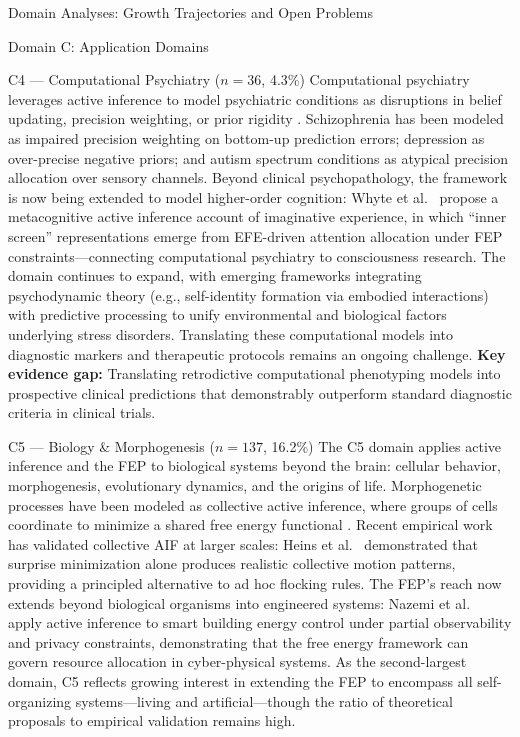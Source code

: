 \documentclass[
  ignorenonframetext,
]{beamer}
\begin{document}
\begin{frame}{Domain Analyses: Growth Trajectories and Open Problems
\label{sec:subfield_analyses}}
\begin{block}{Domain C: Application Domains}
\begin{block}{C4 --- Computational Psychiatry (\(n = 36\), 4.3\%)}
\protect{}\label{c4-computational-psychiatry-n-36-4.3}
Computational psychiatry leverages active inference to model psychiatric
conditions as disruptions in belief updating, precision weighting, or
prior rigidity \citep{smith2021computational}. Schizophrenia has been
modeled as impaired precision weighting on bottom-up prediction errors;
depression as over-precise negative priors; and autism spectrum
conditions as atypical precision allocation over sensory channels.
Beyond clinical psychopathology, the framework is now being extended to
model higher-order cognition: Whyte et
al.~\citep{whyte2025metacognitive} propose a metacognitive active
inference account of imaginative experience, in which ``inner screen''
representations emerge from EFE-driven attention allocation under FEP
constraints---connecting computational psychiatry to consciousness
research. The domain continues to expand, with emerging frameworks
integrating psychodynamic theory (e.g., self-identity formation via
embodied interactions) with predictive processing to unify environmental
and biological factors underlying stress disorders. Translating these
computational models into diagnostic markers and therapeutic protocols
remains an ongoing challenge. \textbf{Key evidence gap:} Translating
retrodictive computational phenotyping models into prospective clinical
predictions that demonstrably outperform standard diagnostic criteria in
clinical trials.
\end{block}

\begin{block}{C5 --- Biology \& Morphogenesis (\(n = 137\), 16.2\%)}
\protect{}\label{c5-biology-morphogenesis-n-137-16.2}
The C5 domain applies active inference and the FEP to biological systems
beyond the brain: cellular behavior, morphogenesis, evolutionary
dynamics, and the origins of life. Morphogenetic processes have been
modeled as collective active inference, where groups of cells coordinate
to minimize a shared free energy functional
\citep{kuchling2020morphogenesis, levin2022technological}. Recent
empirical work has validated collective AIF at larger scales: Heins et
al.~\citep{heins2024collective} demonstrated that surprise minimization
alone produces realistic collective motion patterns, providing a
principled alternative to ad hoc flocking rules. The FEP's reach now
extends beyond biological organisms into engineered systems: Nazemi et
al.~\citep{nazemi2025energy} apply active inference to smart building
energy control under partial observability and privacy constraints,
demonstrating that the free energy framework can govern resource
allocation in cyber-physical systems. As the second-largest domain, C5
reflects growing interest in extending the FEP to encompass all
self-organizing systems---living and artificial---though the ratio of
theoretical proposals to empirical validation remains high.
\end{block}
\end{block}


\end{frame}
\end{document}
